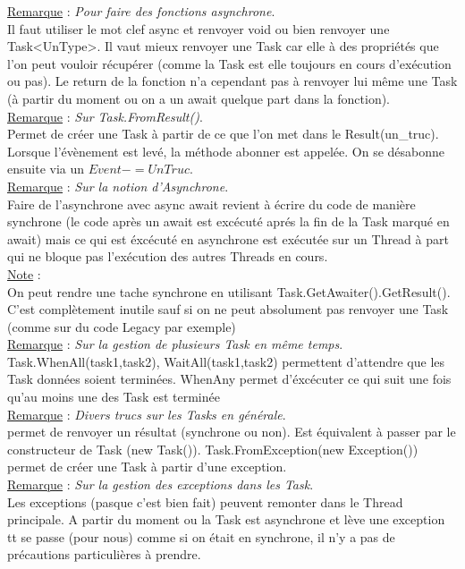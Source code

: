 \documentclass[a4paper,12pt,twoside]{article}
\newcommand{\incode}[1]{{\footnotesize\ttfamily #1}} %
\newcommand{\rem}[2]{\noindent\underline{Remarque} : \textit{#1}.\\ \indent #2}
\newcommand{\note}[1]{\noindent\underline{Note} : \\ \indent #1}
\begin{document}
\rem{Pour faire des fonctions asynchrone}{Il faut utiliser le mot clef \incode{async} et renvoyer void ou bien renvoyer une \incode{Task<UnType>}. Il vaut mieux renvoyer une Task car elle à des propriétés que l'on peut vouloir récupérer (comme la Task est elle toujours en cours d'exécution ou pas). Le \incode{return} de la fonction n'a cependant pas à renvoyer lui même une \incode{Task} (à partir du moment ou on a un \incode{await} quelque part dans la fonction).}\\

\rem{Sur \incode{Task.FromResult()}}{Permet de créer une \incode{Task} à partir de ce que l'on met dans le \incode{Result(un\_truc)}. Lorsque l'évènement est levé, la méthode abonner est appelée. On se désabonne ensuite via un $Event -= UnTruc$.}\\

\rem{Sur la notion d'Asynchrone}{Faire de l'asynchrone avec \incode{async await} revient à écrire du code de manière synchrone (le code après un await est excécuté aprés la fin de la Task marqué en await) mais ce qui est éxcécuté en asynchrone est exécutée sur un Thread à part qui ne bloque pas l'exécution des autres Threads en cours.}\\

\note{On peut rendre une tache synchrone en utilisant \incode{Task.GetAwaiter().GetResult()}. C'est complètement inutile sauf si on ne peut absolument pas renvoyer une \incode{Task} (comme sur du code Legacy par exemple)}\\

\rem{Sur la gestion de plusieurs Task en même temps}{Task.WhenAll(task1,task2), WaitAll(task1,task2) permettent d'attendre que les Task données soient terminées. \incode{WhenAny} permet d'éxcécuter ce qui suit une fois qu'au moins une des Task est terminée}\\

\rem{Divers trucs sur les Tasks en générale}{\incode{Task.FromResult(résultat)} permet de renvoyer un résultat (synchrone ou non). Est équivalent à passer par le constructeur de Task (\incode{new Task()}). \incode{Task.FromException(new Exception())} permet de créer une Task à partir d'une exception.}\\

\rem{Sur la gestion des exceptions dans les Task}{Les exceptions (pasque c'est bien fait) peuvent remonter dans le Thread principale. A partir du moment ou la Task est asynchrone et lève une exception tt se passe (pour nous) comme si on était en synchrone, il n'y a pas de précautions particulières à prendre.}\\
\end{document}
